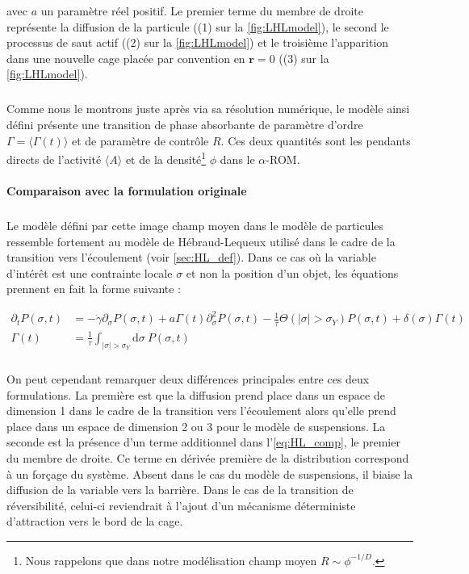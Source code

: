 \noindent avec $a$ un paramètre réel positif. Le premier terme du membre de droite représente la diffusion de la particule ((1) sur la \autoref{fig:LHLmodel}), le second le processus de saut actif ((2) sur la \autoref{fig:LHLmodel}) et le troisième l'apparition dans une nouvelle cage placée par convention en $\mathbf{r}=0$ ((3) sur la \autoref{fig:LHLmodel}). 

\subparagraph{}Comme nous le montrons juste après via sa résolution numérique, le modèle ainsi défini présente une transition de phase absorbante de paramètre d'ordre $\Gamma = \langle \Gamma (t) \rangle$ et de paramètre de contrôle $R$. Ces deux quantités sont les pendants directs de l'activité $\langle A \rangle$ et de la densité\footnote{Nous rappelons que dans notre modélisation champ moyen $R\sim \phi^{-1/D}$.} $\phi$ dans le $\alpha$-ROM.


\paragraph{Comparaison avec la formulation originale}

\subparagraph{}Le modèle défini par cette image champ moyen dans le modèle de particules ressemble fortement au modèle de Hébraud-Lequeux utilisé dans le cadre de la transition vers l'écoulement (voir \autoref{sec:HL_def}). Dans ce cas où la variable d'intérêt est une contrainte locale $\sigma$ et non la position d'un objet, les équations prennent en fait la forme suivante :

\begin{equation}
\begin{aligned}
    \partial_t P(\sigma, t) &= -\dot{\gamma}\partial_\sigma P(\sigma, t)+a\Gamma (t)\partial_\sigma^2 P(\sigma, t) - \frac{1}{\tau}\Theta(|\sigma|>\sigma_Y)P(\sigma, t) + \delta(\sigma)\Gamma (t)\\
    \Gamma (t) &= \frac{1}{\tau}\int_{|\sigma|>\sigma_Y}\mathrm{d}\sigma~P(\sigma, t)
\end{aligned}
\label{eq:HL_comp}
\end{equation} 

\subparagraph{} On peut cependant remarquer deux différences principales entre ces deux formulations. La première est que la diffusion prend place dans un espace de dimension 1 dans le cadre de la transition vers l'écoulement alors qu'elle prend place dans un espace de dimension 2 ou 3 pour le modèle de suspensions. La seconde est la présence d'un terme additionnel dans l'\autoref{eq:HL_comp}, le premier du membre de droite. Ce terme en dérivée première de la distribution correspond à un forçage du système. Absent dans le cas du modèle de suspensions, il biaise la diffusion de la variable vers la barrière. Dans le cas de la transition de réversibilité, celui-ci reviendrait à l'ajout d'un mécanisme déterministe d'attraction vers le bord de la cage.

